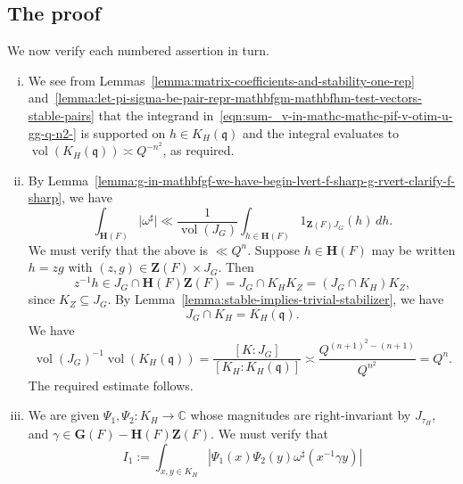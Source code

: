 \documentclass[reqno]{amsart}
\DeclareMathOperator{\vol}{vol}
\theoremstyle{plain} \newtheorem{theorem} {Theorem} \newtheorem{conjecture} {Conjecture} \newtheorem{corollary} [theorem] {Corollary} \newtheorem{proposition} [theorem] {Proposition} \newtheorem{fact} [theorem] {Fact}
\theoremstyle{definition} \newtheorem{definition} [theorem] {Definition}
\theoremstyle{itplain} %
\newcommand{\mfq}{\mathfrak{q}}
\begin{document}
\subsection{The proof}\label{sec:proof-main-local-compact}
We now verify each numbered assertion in turn.
\begin{enumerate}[(i)]
\item We see from Lemmas~\ref{lemma:matrix-coefficients-and-stability-one-rep} and~\ref{lemma:let-pi-sigma-be-pair-repr-mathbfgm-mathbfhm-test-vectors-stable-pairs} that the integrand in~\eqref{eqn:sum-_v-in-mathc-mathc-pif-v-otim-u-gg-q-n2-} is supported on $h \in K_H(\mfq)$ and the integral evaluates to $\vol(K_H(\mfq)) \asymp Q^{-n^2}$, as required.
\item By Lemma~\ref{lemma:g-in-mathbfgf-we-have-begin-lvert-f-sharp-g-rvert-clarify-f-sharp}, we have
  \begin{equation}\label{eqn:int-_mathbfhf-lvert-f-sharp-rvert-ll-frac1v-int-_h}
    \int _{\mathbf{H}(F)} \lvert \omega ^\sharp  \rvert \ll
    \frac{1}{\vol(J_G)}
    \int _{h \in \mathbf{H}(F)} 1 _{\mathbf{Z}(F) J_G }(h) \, d h.
  \end{equation}
  We must verify that the above is $\ll Q^n$.  Suppose $h \in \mathbf{H}(F)$ may be written $h = z g$ with $(z, g ) \in \mathbf{Z} (F) \times J _G$.  Then
  \begin{equation*}
    z^{-1} h \in J_G \cap \mathbf{H}(F) \mathbf{Z}(F) = J_G \cap K_H K_Z
    = (J_G \cap K_H)K_Z,
  \end{equation*}
  since $K_Z \subseteq J_G$.  By Lemma~\ref{lemma:stable-implies-trivial-stabilizer}, we have
  \begin{equation*}
    J_G \cap K_H = K_H(\mfq).
  \end{equation*}
  We have
  \begin{equation}\label{eqn:volj_g-=-k_g-:-j_g-1-asymp-qn+12-n+1-=-qnn+1.-vol-J-G} {\vol(J_G)}^{-1} \vol(K_H(\mfq))
    = \frac{[K : J_G]}{[K_H : K_H(\mfq)]} \asymp \frac{Q^{{(n+1)}^2 - (n+1)}}{Q^{n^2}} = Q^{n}.
  \end{equation}
  The required estimate follows.
\item We are given $\Psi_1, \Psi_2 : K_H \rightarrow \mathbb{C}$ whose magnitudes are right-invariant by $J_{\tau_H}$, and $\gamma \in \mathbf{G}(F) - \mathbf{H}(F) \mathbf{Z}(F)$.  We must verify that
  \begin{equation}\label{eqn:i_1-:=-int-_x-y-in-k_h-leftlv-psi_1x-psi_2y-f-shar-task}
    I_1 := \int _{x, y \in K_H} \left\lvert \Psi_1(x) \Psi_2(y) \omega ^\sharp (x ^{-1} \gamma y) \right\rvert

\end{equation}
\end{enumerate}
\end{document}

